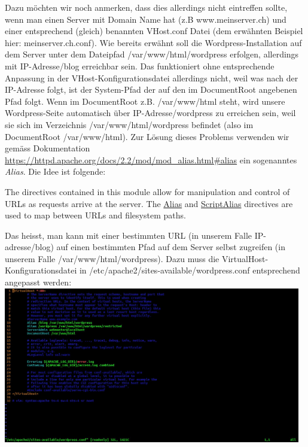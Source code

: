 \documentclass{article}
\begin{document}
	\newline
	Dazu möchten wir noch anmerken, dass dies allerdings nicht eintreffen sollte, wenn man einen Server mit Domain Name hat (z.B www.meinserver.ch) und einer entsprechend (gleich) benannten VHost.conf Datei (dem erwähnten Beispiel hier: meinserver.ch.conf). 
	\newline
	\newline
	Wie bereits erwähnt soll die Wordpress-Installation auf dem Server unter dem Dateipfad /var/www/html/wordpress erfolgen, allerdings mit IP-Adresse/blog erreichbar sein. Das funktioniert ohne entsprechende Anpassung in der VHost-Konfigurationsdatei allerdings nicht, weil was nach der IP-Adresse folgt, ist der System-Pfad der auf den im DocumentRoot angebenen Pfad folgt. Wenn im DocumentRoot z.B. /var/www/html steht, wird unsere Wordpress-Seite automatisch über IP-Adresse/wordpress zu erreichen sein, weil sie sich im Verzeichnis /var/www/html/wordpress befindet (also im DocumentRoot /var/www/html).
	\newline
	\newline
	Zur Lösung dieses Problems verwenden wir gemäss Dokumentation \url{https://httpd.apache.org/docs/2.2/mod/mod_alias.html\#alias} ein sogenanntes \textit{Alias}. Die Idee ist folgende:
	\begin{displayquote}
	The directives contained in this module allow for manipulation and control of URLs as requests arrive at the server. The \underline{Alias} and \underline{ScriptAlias} directives are used to map between URLs and filesystem paths.
	\end{displayquote}
	Das heisst, man kann mit einer bestimmten URL (in unserem Falle IP-adresse/blog) auf einen bestimmten Pfad auf dem Server selbst zugreifen (in unserem Falle /var/www/html/wordpress). Dazu muss die VirtualHost- Konfigurationsdatei in /etc/apache2/sites-available/wordpress.conf entsprechend angepasst werden:
	\newline
	\includegraphics[width=13cm]{../Pics/wordpress}
\end{document}
